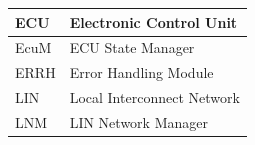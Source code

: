 \begin{longtable}{|l|l|}
\begin{minipage}{0.31\linewidth}\raggedright\vspace{.75ex}ECU\vspace{.75ex}\end{minipage} & \begin{minipage}{0.63\linewidth}\raggedright\vspace{.75ex}Electronic Control Unit\vspace{.75ex}\end{minipage}\\\hline
\begin{minipage}{0.31\linewidth}\raggedright\vspace{.75ex}EcuM\vspace{.75ex}\end{minipage} & \begin{minipage}{0.63\linewidth}\raggedright\vspace{.75ex}ECU State Manager\vspace{.75ex}\end{minipage}\\\hline
\begin{minipage}{0.31\linewidth}\raggedright\vspace{.75ex}ERRH\vspace{.75ex}\end{minipage} & \begin{minipage}{0.63\linewidth}\raggedright\vspace{.75ex}Error Handling Module\vspace{.75ex}\end{minipage}\\\hline
\begin{minipage}{0.31\linewidth}\raggedright\vspace{.75ex}LIN\vspace{.75ex}\end{minipage} & \begin{minipage}{0.63\linewidth}\raggedright\vspace{.75ex}Local Interconnect Network\vspace{.75ex}\end{minipage}\\\hline
\begin{minipage}{0.31\linewidth}\raggedright\vspace{.75ex}LNM\vspace{.75ex}\end{minipage} & \begin{minipage}{0.63\linewidth}\raggedright\vspace{.75ex}LIN Network Manager\vspace{.75ex}\end{minipage}\\\hline

\end{longtable}

